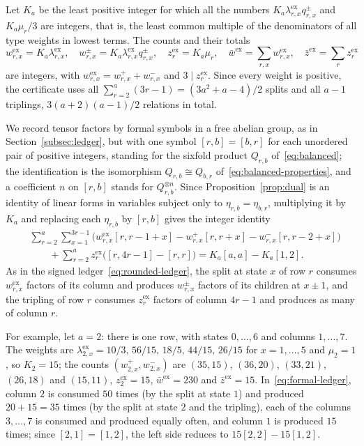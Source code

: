 Let \(K_a\) be the least positive integer for which all the numbers
\(K_a\lambda^{\mathrm{ex}}_{r,x}q^\pm_{r,x}\) and \(K_a\mu_r/3\) are
integers, that is, the least common multiple of the denominators of all
type weights in lowest terms. The counts and their totals
\begin{equation}\label{eq:type-totals}
 w^{\mathrm{ex}}_{r,x}=K_a\lambda^{\mathrm{ex}}_{r,x},\quad
 w^\pm_{r,x}=K_a\lambda^{\mathrm{ex}}_{r,x}q^\pm_{r,x},\quad
 z^{\mathrm{ex}}_r=K_a\mu_r,\quad
 \bar w^{\mathrm{ex}}=\textstyle\sum_{r,x}w^{\mathrm{ex}}_{r,x},\quad
 \bar z^{\mathrm{ex}}=\sum_rz^{\mathrm{ex}}_r
\end{equation}
are integers, with \(w^{\mathrm{ex}}_{r,x}=w^+_{r,x}+w^-_{r,x}\) and
\(3\mid z^{\mathrm{ex}}_r\).
Since every weight is positive, the certificate uses all
\(\sum_{r=2}^a(3r-1)=(3a^2+a-4)/2\) splits and all \(a-1\) triplings,
\(3(a+2)(a-1)/2\) relations in total.

We record tensor factors by formal symbols in a free abelian group, as in
Section~\ref{subsec:ledger}, but with one symbol \([r,b]=[b,r]\) for each
unordered pair of positive integers, standing for the sixfold product
\(Q_{r,b}\) of~\eqref{eq:balanced}; the identification is the
isomorphism \(Q_{r,b}\cong Q_{b,r}\) of~\eqref{eq:balanced-properties},
and a coefficient \(n\) on \([r,b]\) stands for \(Q_{r,b}^{\otimes n}\).
Since Proposition~\ref{prop:dual} is an identity of linear forms in
variables subject only to \(\eta_{r,b}=\eta_{b,r}\), multiplying it by
\(K_a\) and replacing each \(\eta_{r,b}\) by \([r,b]\) gives the integer
identity
\begin{equation}\label{eq:formal-ledger}
 \begin{split}
 &\sum_{r=2}^a\sum_{x=1}^{3r-1}
 \bigl(w^{\mathrm{ex}}_{r,x}[r,r-1+x]-w^+_{r,x}[r,r+x]
 -w^-_{r,x}[r,r-2+x]\bigr)\\
 &\qquad+\sum_{r=2}^az^{\mathrm{ex}}_r\bigl([r,4r-1]-[r,r]\bigr)
 =K_a[a,a]-K_a[1,2].
 \end{split}
\end{equation}
As in the signed ledger~\eqref{eq:rounded-ledger}, the split at state
\(x\) of row \(r\) consumes \(w^{\mathrm{ex}}_{r,x}\) factors of its
column and produces \(w^\pm_{r,x}\) factors of its children at \(x\pm1\),
and the tripling of row \(r\) consumes \(z^{\mathrm{ex}}_r\) factors of
column \(4r-1\) and produces as many of column \(r\).

For example, let \(a=2\): there is one row, with states \(0,\ldots,6\)
and columns \(1,\ldots,7\). The weights are
\(\lambda^{\mathrm{ex}}_{2,x}=10/3,\,56/15,\,18/5,\,44/15,\,26/15\) for
\(x=1,\ldots,5\) and \(\mu_2=1\), so \(K_2=15\); the counts
\((w^+_{2,x},w^-_{2,x})\) are \((35,15)\), \((36,20)\), \((33,21)\),
\((26,18)\) and \((15,11)\), \(z^{\mathrm{ex}}_2=15\),
\(\bar w^{\mathrm{ex}}=230\) and \(\bar z^{\mathrm{ex}}=15\).
In~\eqref{eq:formal-ledger}, column \(2\) is consumed \(50\) times (by
the split at state \(1\)) and produced \(20+15=35\) times (by the split
at state \(2\) and the tripling), each of the columns \(3,\ldots,7\) is
consumed and produced equally often, and column \(1\) is produced \(15\)
times; since \([2,1]=[1,2]\), the left side reduces to
\(15[2,2]-15[1,2]\).

